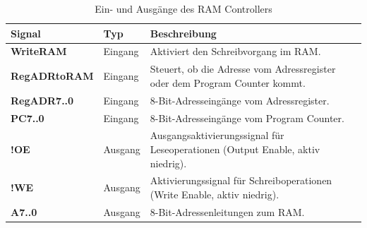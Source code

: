 \begin{table}[H]
  \centering
  \begin{tabular}{|l|l|p{9cm}|}
    \hline
    \textbf{Signal}      & \textbf{Typ} & \textbf{Beschreibung}                                                          \\ \hline
    \textbf{WriteRAM}    & Eingang      & Aktiviert den Schreibvorgang im RAM.                                           \\ \hline
    \textbf{RegADRtoRAM} & Eingang      & Steuert, ob die Adresse vom Adressregister oder dem Program Counter kommt.     \\ \hline
    \textbf{RegADR7..0}  & Eingang      & 8-Bit-Adresseingänge vom Adressregister.                                       \\ \hline
    \textbf{PC7..0}      & Eingang      & 8-Bit-Adresseingänge vom Program Counter.                                      \\ \hline
    \textbf{!OE}         & Ausgang      & Ausgangsaktivierungssignal für Leseoperationen (Output Enable, aktiv niedrig). \\ \hline
    \textbf{!WE}         & Ausgang      & Aktivierungssignal für Schreiboperationen (Write Enable, aktiv niedrig).       \\ \hline
    \textbf{A7..0}       & Ausgang      & 8-Bit-Adressenleitungen zum RAM.                                               \\ \hline
  \end{tabular}
  \caption{Ein- und Ausgänge des RAM Controllers}
  \label{tab:RAM_Controller}
\end{table}











